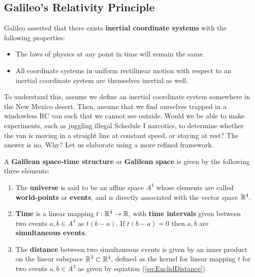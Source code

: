 \documentclass{article}
\begin{document}
		\subsection{Galileo's Relativity Principle}
		Galileo asserted that there exists \textbf{inertial coordinate systems} with the following properties:
		\begin{itemize}
			\item The laws of physics at any point in time will remain the same.
			\item All coordinate systems in uniform rectilinear motion with respect to an inertial coordinate system are themselves inertial as well.
		\end{itemize}
		To understand this, assume we define an inertial coordinate system somewhere in the New Mexico desert. Then, assume that we find ourselves trapped in a windowless RC van such that we cannot see outside. Would we be able to make experiments, such as juggling illegal Schedule I narcotics, to determine whether the van is moving in a straight line at constant speed, or staying at rest? The answer is no. Why? Let us elaborate using a more refined framework.
		
		\begin{defn}
			A \textbf{Galilean space-time structure} or \textbf{Galilean space} is given by the following three elements:
			\begin{enumerate}
				\item The \textbf{universe} is said to be an affine space $A^4$ whose elements are called \textbf{world-points} or \textbf{events}, and is directly associated with the vector space $\mathbb{R}^4$.
				\item \textbf{Time} is a linear mapping $t: \mathbb{R}^4 \to \mathbb{R}$, with \textbf{time intervals} given between two events $a, b \in A^4$ as $t\left(b-a\right)$. If $t(b-a) =0$ then $a,b$ are \textbf{simultaneous events}.
				\item The \textbf{distance} between two simultaneous events is given by an inner product on the linear subspace $\mathbb{R}^3 \subset \mathbb{R}^4$, defined as the kernel for linear mapping $t$ for two events $a, b \in A^3$ as given by equation (\ref{eq:EuclidDistance}). 
			\end{enumerate}
		\end{defn}
		
\end{document}
